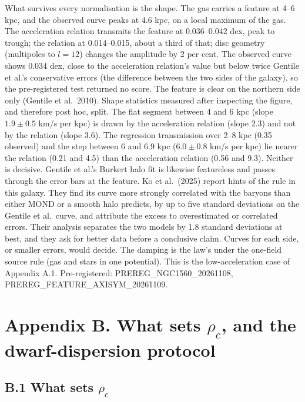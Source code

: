 \documentclass[
  10pt,
]{article}
\begin{document}
What survives every normalisation is the shape. The gas carries a feature at 4--6 kpc, and the observed curve peaks at 4.6 kpc, on a local maximum of the gas. The acceleration relation transmits the feature at 0.036--0.042 dex, peak to trough; the relation at 0.014--0.015, about a third of that; disc geometry (multipoles to $l=12$) changes the amplitude by 2 per cent. The observed curve shows 0.034 dex, close to the acceleration relation's value but below twice Gentile et al.'s conservative errors (the difference between the two sides of the galaxy), so the pre-registered test returned no score. The feature is clear on the northern side only (Gentile et al.~2010). Shape statistics measured after inspecting the figure, and therefore post hoc, split. The flat segment between 4 and 6 kpc (slope $1.9\pm0.5$ km/s per kpc) is drawn by the acceleration relation (slope 2.3) and not by the relation (slope 3.6). The regression transmission over 2--8 kpc (0.35 observed) and the step between 6 and 6.9 kpc ($6.0\pm0.8$ km/s per kpc) lie nearer the relation (0.21 and 4.5) than the acceleration relation (0.56 and 9.3). Neither is decisive. Gentile et al.'s Burkert halo fit is likewise featureless and passes through the error bars at the feature. Ko et al.~(2025) report hints of the rule in this galaxy. They find its curve more strongly correlated with the baryons than either MOND or a smooth halo predicts, by up to five standard deviations on the Gentile et al.\ curve, and attribute the excess to overestimated or correlated errors. Their analysis separates the two models by 1.8 standard deviations at best, and they ask for better data before a conclusive claim. Curves for each side, or smaller errors, would decide. The damping is the law's under the one-field source rule (gas and stars in one potential). This is the low-acceleration case of Appendix A.1. Pre-registered: PREREG\_NGC1560\_20261108, PREREG\_FEATURE\_AXISYM\_20261109.

\section{Appendix B. What sets \texorpdfstring{$\rho_c$}{rho c}, and the dwarf-dispersion protocol}\label{appendix-b.-what-sets-rho_c-and-the-dwarf-dispersion-protocol}

\subsection{B.1 What sets \texorpdfstring{$\rho_c$}{rho c}}\label{what-sets-rho_c}
\end{document}
